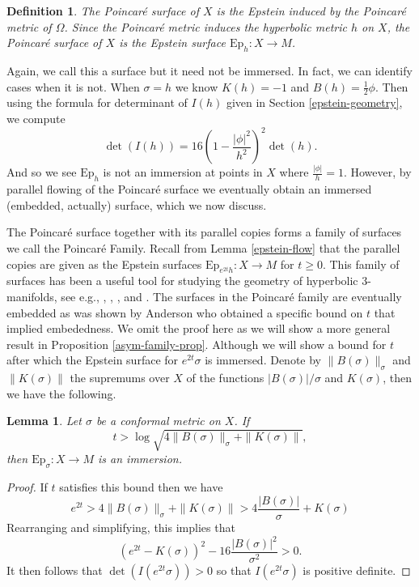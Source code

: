 \documentclass{amsart}
\newtheorem{lem}[thm]{Lemma}
\newtheorem{defn}{Definition}
\begin{document}
\begin{defn}
The Poincar\'e surface of $X$ is the Epstein induced by the Poincar\'e metric of $\Omega$. 
Since the Poincar\'e metric induces the hyperbolic metric $h$ on $X$, the Poincar\'e surface of $X$ is the Epstein surface $\mathrm{Ep}_h: X \to M$.
\end{defn}


Again, we call this a surface but it need not be immersed. 
In fact, we can identify cases when it is not. 
When $\sigma = h$ we know $K(h) = -1$ and $B(h) = \frac{1}{2}\phi$. 
Then using the formula for determinant of $I(h)$ given in Section \ref{epstein-geometry}, we compute
\[
\det(I(h)) = 16 \left( 1 - \frac{|\phi|^2}{h^2} \right)^2 \det(h).
\]
And so we see $\mathrm{Ep}_h$ is not an immersion at points in $X$ where $\frac{|\phi|}{h} =1$. 
However, by parallel flowing of the Poincar\'e surface we eventually obtain an immersed (embedded, actually) surface, which we now discuss. 


The Poincar\'e surface together with its parallel copies forms a family of surfaces we call the Poincar\'e Family. 
Recall from Lemma \ref{epstein-flow} that the parallel copies are given as the Epstein surfaces $\mathrm{Ep}_{e^{2t}h}: X \to M$ for $t \geq 0$. 
This family of surfaces has been a useful tool for studying the geometry of hyperbolic 3-manifolds, see e.g., \cite{anderson1998}, \cite{bromberg2004}, \cite{krasnov-schlenker2008}, and \cite{bridgeman-brock-bromberg2019}.
The surfaces in the Poincar\'e family are eventually embedded as was shown by Anderson \cite{anderson1998} who obtained a specific bound on $t$ that implied embededness. 
We omit the proof here as we will show a more general result in Proposition \ref{asym-family-prop}. 
Although we will show a bound for $t$ after which the Epstein surface for $e^{2t}\sigma$ is immersed. 
Denote by $\|B(\sigma)\|_\sigma$ and $\|K(\sigma)\|$ the supremums over $X$ of the functions $|B(\sigma)|/\sigma$ and $K(\sigma)$, then we have the following.

\begin{lem}\label{parallel-family-immersed}
Let $\sigma$ be a conformal metric on $X$. 
If 
\[
t > \log  \sqrt{ 4 \|B(\sigma)\|_\sigma + \|K(\sigma)\|},
\]
then $\mathrm{Ep}_\sigma: X \to M$ is an immersion.
\end{lem}

\begin{proof}
If $t$ satisfies this bound then we have
\[
e^{2t} > 4 \|B(\sigma)\|_\sigma + \|K(\sigma)\| > 4 \frac{|B(\sigma)|}{\sigma} + K(\sigma)
\]
Rearranging and simplifying, this implies that 
\[
(e^{2t} - K(\sigma))^2 - 16\frac{|B(\sigma)|^2}{\sigma^2} > 0.
\]
It then follows that $\det(I(e^{2t}\sigma)) > 0$ so that $I(e^{2t}\sigma)$ is positive definite. 
\end{proof}
\end{document}
